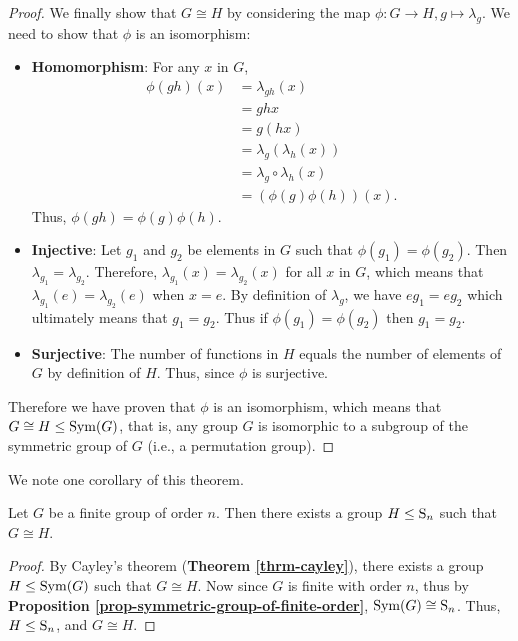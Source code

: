 \begin{proof}
    We finally show that $G \cong H$ by considering the map $\phi: G\to H, g \mapsto \lambda_g$. We need to show that $\phi$ is an isomorphism:
    \begin{itemize}
        \item \textbf{Homomorphism}: For any $x$ in $G$,
            \begin{align*}
                \phi(gh)(x) &= \lambda_{gh}(x)\\
                &= ghx\\
                &= g(hx)\\
                &= \lambda_g\left(\lambda_h(x)\right)\\
                &= \lambda_g\circ\lambda_h(x)\\
                &= (\phi(g)\phi(h))(x).
            \end{align*}
            Thus, $\phi(gh) = \phi(g)\phi(h)$.
        \item \textbf{Injective}: Let $g_1$ and $g_2$ be elements in $G$ such that $\phi(g_1) = \phi(g_2)$. Then $\lambda_{g_1} = \lambda_{g_2}$. Therefore, $\lambda_{g_1}(x) = \lambda_{g_2}(x)$ for all $x$ in $G$, which means that $\lambda_{g_1}(e) = \lambda_{g_2}(e)$ when $x = e$. By definition of $\lambda_g$, we have $eg_1 = eg_2$ which ultimately means that $g_1=g_2$. Thus if $\phi(g_1) = \phi(g_2)$ then $g_1=g_2$.
        \item \textbf{Surjective}: The number of functions in $H$ equals the number of elements of $G$ by definition of $H$. Thus, since $\phi$ is surjective.
    \end{itemize}
    Therefore we have proven that $\phi$ is an isomorphism, which means that $G \cong H \leq \mathrm{Sym}(G)$, that is, any group $G$ is isomorphic to a subgroup of the symmetric group of $G$ (i.e., a permutation group).
\end{proof}

We note one corollary of this theorem.
\begin{corollary-thrm}
    Let $G$ be a finite group of order $n$. Then there exists a group $H \leq \mathrm{S}_{n}$ such that $G \cong H$.
\end{corollary-thrm}
\begin{proof}
    By Cayley's theorem (\textbf{Theorem \ref{thrm-cayley}}), there exists a group $H \leq \mathrm{Sym}(G)$ such that $G \cong H$. Now since $G$ is finite with order $n$, thus by \textbf{Proposition \ref{prop-symmetric-group-of-finite-order}}, $\mathrm{Sym}(G) \cong \mathrm{S}_{n}$. Thus, $H \leq \mathrm{S}_{n}$, and $G \cong H$.
\end{proof}

